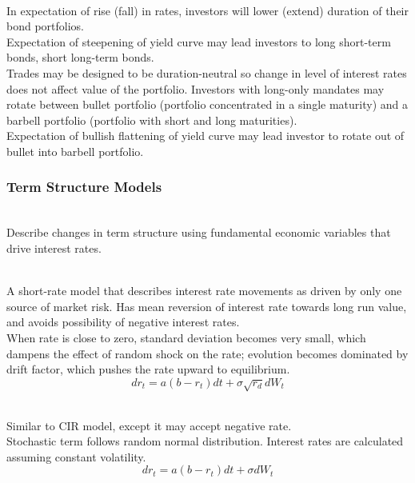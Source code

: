 \begin{remark} \\
In expectation of rise (fall) in rates, investors will lower (extend) duration of their bond portfolios.\\
Expectation of steepening of yield curve may lead investors to long short-term bonds, short long-term bonds.\\
Trades may be designed to be duration-neutral so change in level of interest rates does not affect value of the portfolio. Investors with long-only mandates may rotate between bullet portfolio (portfolio concentrated in a single maturity) and a barbell portfolio (portfolio with short and long maturities).\\
Expectation of bullish flattening of yield curve may lead investor to rotate out of bullet into barbell portfolio.
\end{remark}

\subsubsection{Term Structure Models}

\begin{definition} \\
Describe changes in term structure using fundamental economic variables that drive interest rates.
\end{definition}

\begin{remark} \\
A short-rate model that describes interest rate movements as driven by only one source of market risk. Has mean reversion of interest rate towards long run value, and avoids possibility of negative interest rates.\\
When rate is close to zero, standard deviation becomes very small, which dampens the effect of random shock on the rate; evolution becomes dominated by drift factor, which pushes the rate upward to equilibrium.
\begin{equation}
dr_t = a(b-r_t) dt + \sigma \sqrt{r_d} dW_t \nonumber
\end{equation}
\end{remark}

\begin{remark} \\
Similar to CIR model, except it may accept negative rate.\\
Stochastic term follows random normal distribution. Interest rates are calculated assuming constant volatility.
\begin{equation}
dr_t = a(b-r_t) dt + \sigma dW_t \nonumber
\end{equation}
\end{remark}


